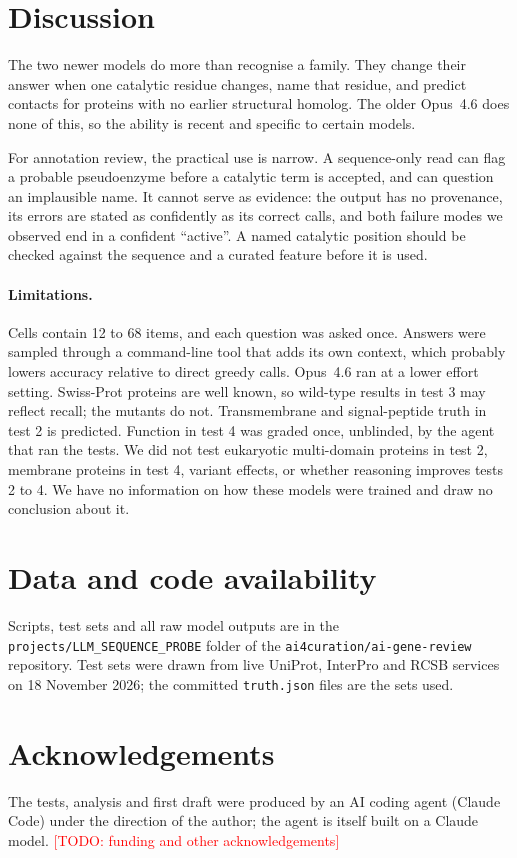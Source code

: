 \documentclass[11pt]{article}
\newcommand{\todo}[1]{\textcolor{red}{[TODO: #1]}}
\begin{document}
\section{Discussion}

The two newer models do more than recognise a family. They change their answer when one catalytic
residue changes, name that residue, and predict contacts for proteins with no earlier structural
homolog. The older Opus~4.6 does none of this, so the ability is recent and specific to certain models.

For annotation review, the practical use is narrow. A sequence-only read can flag a probable pseudoenzyme
before a catalytic term is accepted, and can question an implausible name. It cannot serve as evidence:
the output has no provenance, its errors are stated as confidently as its correct calls, and both failure
modes we observed end in a confident ``active''. A named catalytic position should be checked against the
sequence and a curated feature before it is used.

\paragraph{Limitations.} Cells contain 12 to 68 items, and each question was asked once. Answers were
sampled through a command-line tool that adds its own context, which probably lowers accuracy relative to
direct greedy calls. Opus~4.6 ran at a lower effort setting. Swiss-Prot proteins are well known, so
wild-type results in test 3 may reflect recall; the mutants do not. Transmembrane and signal-peptide truth
in test 2 is predicted. Function in test 4 was graded once, unblinded, by the agent that ran the tests. We did not test eukaryotic
multi-domain proteins in test 2, membrane proteins in test 4, variant effects, or whether reasoning
improves tests 2 to 4. We have no information on how these models were trained and draw no conclusion
about it.

\section*{Data and code availability}

Scripts, test sets and all raw model outputs are in the \texttt{projects/LLM\_SEQUENCE\_PROBE} folder of
the \texttt{ai4curation/ai-gene-review} repository. Test sets were drawn from live UniProt, InterPro and
RCSB services on 18 November 2026; the committed \texttt{truth.json} files are the sets used.

\section*{Acknowledgements}

The tests, analysis and first draft were produced by an AI coding agent (Claude Code) under the direction
of the author; the agent is itself built on a Claude model. \todo{funding and other
acknowledgements}



\end{document}
